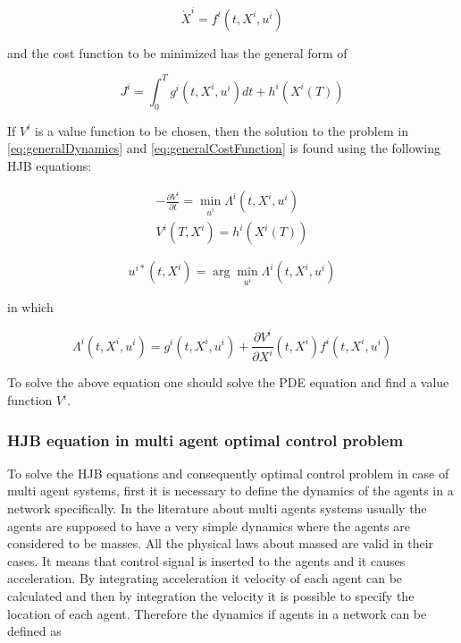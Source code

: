 \documentclass[conference]{IEEEtran}
\begin{document}
\begin{equation}\label{eq:generalDynamics}
\dot{X}^{i}=f^{i}(t,X^{i},u^{i})
\end{equation}

and the cost function to be minimized has the general form of

\begin{equation}\label{eq:generalCostFunction}
J^{i}=\int_{0}^{T}g^{i}(t,X^{i},u^{i})dt + h^{i}(X^{i}(T))
\end{equation}

If $V^{i}$ is a value function to be chosen, then the solution to the problem in \ref{eq:generalDynamics} and \ref{eq:generalCostFunction} is found using the following HJB equations:

\begin{equation}\label{eq:HJB1}
\begin{split}
-\frac{\partial V^{i}}{\partial t}=\displaystyle \min_{u^{i}} \Lambda^{i}(t,X^{i},u^{i})\\
V^{i}(T,X^{i})=h^{i}(X^{i}(T))
\end{split}
\end{equation}

\begin{equation}\label{eq:HJB2}
u^{i*}(t,X^{i})=\arg \displaystyle \min_{u^{i}} \Lambda^{i}(t,X^{i},u^{i})
\end{equation}

in which

\begin{equation}\label{eq:HJB3}
\Lambda^{i}(t,X^{i},u^{i})=g^{i}(t,X^{i},u^{i})+\frac{\partial V^{i}}{\partial X^{i}}(t,X^{i})f^{i}(t,X^{i},u^{i})
\end{equation}

To solve the above equation one should solve the PDE equation and find a value function $V^{i}$.

\subsubsection{HJB equation in multi agent optimal control problem}

To solve the HJB equations and consequently optimal control problem in case of multi agent systems, first it is necessary to define the dynamics of the agents in a network specifically. In the literature about multi agents systems usually the agents are supposed to have a very simple dynamics where the agents are considered to be masses. All the physical laws about massed are valid in their cases. It means that control signal is inserted to the agents and it causes acceleration. By integrating acceleration it velocity of each agent can be calculated and then by integration the velocity it is possible to specify the location of each agent. Therefore the dynamics if agents in a network can be defined as
\end{document}
